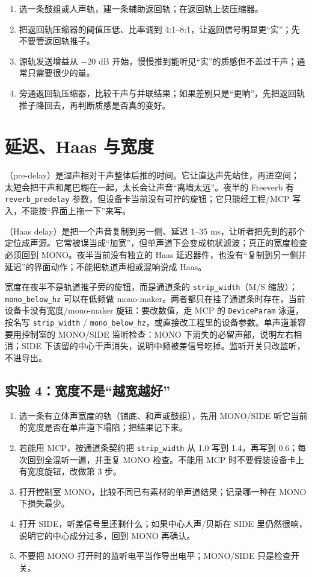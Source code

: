 \begin{enumerate}
  \item 选一条鼓组或人声轨，建一条辅助返回轨；在返回轨上装压缩器。
  \item 把返回轨压缩器的阈值压低、比率调到 4:1–8:1，让返回信号明显更“实”；先不要管返回轨推子。
  \item 源轨发送增益从 $-20$ dB 开始，慢慢推到能听见“实”的质感但不盖过干声；通常只需要很少的量。
  \item 旁通返回轨压缩器，比较干声与并联结果；如果差别只是“更响”，先把返回轨推子降回去，再判断质感是否真的变好。
\end{enumerate}

\section{延迟、Haas 与宽度}

（pre-delay）是湿声相对干声整体后推的时间。它让直达声先站住，再进空间；太短会把干声和尾巴糊在一起，太长会让声音“离墙太远”。夜半的 Freeverb 有 \texttt{reverb\_predelay} 参数，但设备卡当前没有可拧的旋钮；它只能经工程/MCP 写入，不能按“界面上拖一下”来写。

（Haas delay）是把一个声音复制到另一侧、延迟 1–35 ms，让听者把先到的那个定位成声源。它常被误当成“加宽”，但单声道下会变成梳状滤波；真正的宽度检查必须回到 MONO。夜半当前没有独立的 Haas 延迟器件，也没有“复制到另一侧并延迟”的界面动作；不能把轨道声相或混响说成 Haas。

宽度在夜半不是轨道推子旁的旋钮，而是通道条的 \texttt{strip\_width}（M/S 缩放）；\texttt{mono\_below\_hz} 可以在低频做 mono-maker。两者都只在挂了通道条时存在，当前设备卡没有宽度/mono-maker 旋钮：要改数值，走 MCP 的 \texttt{DeviceParam} 泳道，按名写 \texttt{strip\_width} / \texttt{mono\_below\_hz}，或直接改工程里的设备参数。单声道兼容要用控制室的 MONO/SIDE 监听检查：MONO 下消失的必留声部，说明左右相消；SIDE 下该留的中心干声消失，说明中频被差信号吃掉。监听开关只改监听，不进导出。

\subsection{实验 4：宽度不是“越宽越好”}

\begin{enumerate}
  \item 选一条有立体声宽度的轨（铺底、和声或鼓组），先用 MONO/SIDE 听它当前的宽度是否在单声道下塌陷；把结果记下来。
  \item 若能用 MCP，按通道条契约把 \texttt{strip\_width} 从 1.0 写到 1.4，再写到 0.6；每次回到全混听一遍，并重复 MONO 检查。不能用 MCP 时不要假装设备卡上有宽度旋钮，改做第 3 步。
  \item 打开控制室 MONO，比较不同已有素材的单声道结果；记录哪一种在 MONO 下损失最少。
  \item 打开 SIDE，听差信号里还剩什么；如果中心人声/贝斯在 SIDE 里仍然很响，说明它的中心成分过多，回到 MONO 再确认。
  \item 不要把 MONO 打开时的监听电平当作导出电平；MONO/SIDE 只是检查开关。
\end{enumerate}

